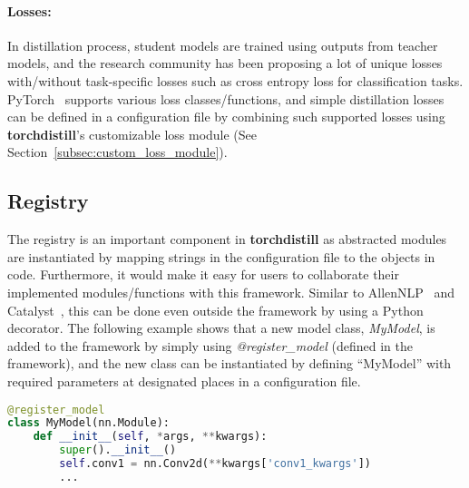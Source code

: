 \documentclass[runningheads]{llncs}
\newcommand{\FRAMEWORK}{{\bf torchdistill}\xspace}
\begin{document}
\paragraph{Losses:}
In distillation process, student models are trained using outputs from teacher models, and the research community has been proposing a lot of unique losses with/without task-specific losses such as cross entropy loss for classification tasks.
PyTorch~\cite{paszke2019pytorch} supports various loss classes/functions, and simple distillation losses can be defined in a configuration file by combining such supported losses using \FRAMEWORK's customizable loss module (See Section~\ref{subsec:custom_loss_module}).


\subsection{Registry}
\label{subsec:registry}

The registry is an important component in \FRAMEWORK as abstracted modules are instantiated by mapping strings in the configuration file to the objects in code.
Furthermore, it would make it easy for users to collaborate their implemented modules/functions with this framework.
Similar to AllenNLP~\cite{gardner2018allennlp} and Catalyst~\cite{catalyst}, this can be done even outside the framework by using a Python decorator.
The following example shows that a new model class, \emph{MyModel}, is added to the framework by simply using \emph{@register\_model} (defined in the framework), and the new class can be instantiated by defining ``MyModel'' with required parameters at designated places in a configuration file.

\begin{lstlisting}[language=Python, backgroundcolor=\color{MintCream}, columns=fullflexible]
@register_model
class MyModel(nn.Module):
    def __init__(self, *args, **kwargs):
        super().__init__()
        self.conv1 = nn.Conv2d(**kwargs['conv1_kwargs'])
        ...
\end{lstlisting}
\end{document}
